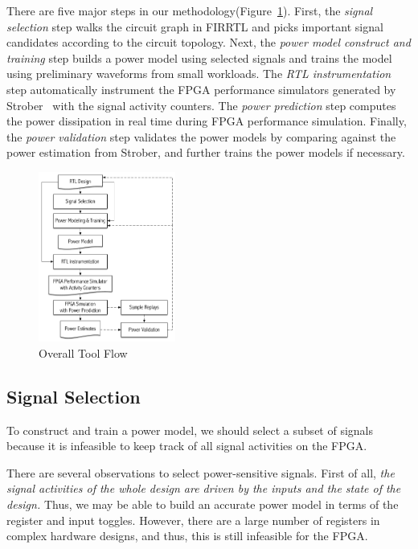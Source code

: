 There are five major steps in our methodology(Figure~\ref{fig:tool_flow}).
First, the \emph{signal selection} step walks the circuit graph in FIRRTL\cite{Li:EECS-2016-9}
and picks important signal candidates according to the circuit topology. 
Next, the \emph{power model construct and training} step builds a power model 
using selected signals and trains the model using preliminary
waveforms from small workloads. The \emph{RTL instrumentation} step automatically
instrument the FPGA performance simulators generated by Strober~\cite{Kim2016} with 
the signal activity counters. The \emph{power prediction} step computes
the power dissipation in real time during FPGA performance simulation.
Finally, the \emph{power validation} step validates the power models by
comparing against the power estimation from Strober,
and further trains the power models if necessary.

\begin{figure}[!ht]
	\centering
	\includegraphics[width=0.4\textwidth,height=\textheight,keepaspectratio]{images/tool_flow.pdf}
	\caption{Overall Tool Flow}
	\label{fig:tool_flow}
\end{figure}

\subsection{Signal Selection}
\label{sec:signal_selection}

To construct and train a power model, we should select a subset of signals
because it is infeasible to keep track of all signal activities on the FPGA.

There are several observations to select power-sensitive signals. First of all,
\emph{the signal activities of the whole design are driven by the inputs and 
the state of the design.} Thus, we may be able to build an accurate power
model in terms of the register and input toggles. However, there are
a large number of registers in complex hardware designs, and thus,
this is still infeasible for the FPGA.

